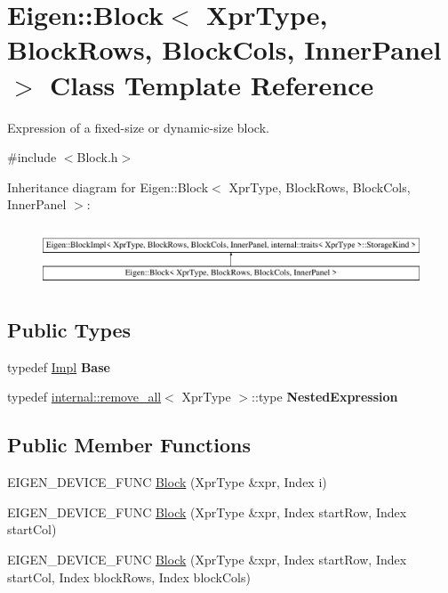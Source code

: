 \hypertarget{class_eigen_1_1_block}{}\section{Eigen\+::Block$<$ Xpr\+Type, Block\+Rows, Block\+Cols, Inner\+Panel $>$ Class Template Reference}
\label{class_eigen_1_1_block}


Expression of a fixed-\/size or dynamic-\/size block.  




{\ttfamily \#include $<$Block.\+h$>$}

Inheritance diagram for Eigen\+::Block$<$ Xpr\+Type, Block\+Rows, Block\+Cols, Inner\+Panel $>$\+:\begin{figure}[H]
\begin{center}
\leavevmode
\includegraphics[height=1.803543cm]{class_eigen_1_1_block}
\end{center}
\end{figure}
\subsection*{Public Types}
\begin{DoxyCompactItemize}
\item 
\mbox{\label{class_eigen_1_1_block_ab6380a1694e62dd00877746c0073ad88}} 
typedef \mbox{\hyperlink{class_eigen_1_1_block_impl}{Impl}} {\bfseries Base}
\item 
\mbox{\label{class_eigen_1_1_block_a5674d819d24fcf80d9349447f8f523ce}} 
typedef \mbox{\hyperlink{struct_eigen_1_1internal_1_1remove__all}{internal\+::remove\+\_\+all}}$<$ Xpr\+Type $>$\+::type {\bfseries Nested\+Expression}
\end{DoxyCompactItemize}
\subsection*{Public Member Functions}
\begin{DoxyCompactItemize}
\item 
E\+I\+G\+E\+N\+\_\+\+D\+E\+V\+I\+C\+E\+\_\+\+F\+U\+NC \mbox{\hyperlink{class_eigen_1_1_block_ab45272f7223731c9a61937e55795c728}{Block}} (Xpr\+Type \&xpr, Index i)
\item 
E\+I\+G\+E\+N\+\_\+\+D\+E\+V\+I\+C\+E\+\_\+\+F\+U\+NC \mbox{\hyperlink{class_eigen_1_1_block_afdf396b628ef3874414bbfc4ebd72ab4}{Block}} (Xpr\+Type \&xpr, Index start\+Row, Index start\+Col)
\item 
E\+I\+G\+E\+N\+\_\+\+D\+E\+V\+I\+C\+E\+\_\+\+F\+U\+NC \mbox{\hyperlink{class_eigen_1_1_block_a09e495968e1c52a5838bfd102978e09e}{Block}} (Xpr\+Type \&xpr, Index start\+Row, Index start\+Col, Index block\+Rows, Index block\+Cols)
\end{DoxyCompactItemize}


